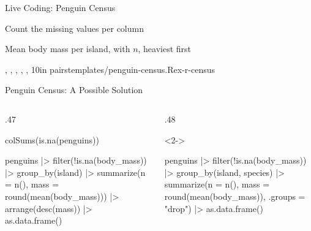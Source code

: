 \begin{frame}{Live Coding: Penguin Census}
   {\item Count the missing values per column
    \item Mean body mass per island, with \(n\), heaviest first}
   {, , , , , }
   {10}{in pairs}{templates/penguin-census.R}{ex-r-census}
\end{frame}

\begin{frame}{Penguin Census: A Possible Solution}
\begin{columns}[t,onlytextwidth]
   \begin{column}{.47\textwidth}
\tiny
{}
\begin{rsession}
colSums(is.na(penguins))
\end{rsession}
\begin{rsession}
penguins |>
  filter(!is.na(body_mass)) |>
  group_by(island) |>
  summarize(n = n(),
    mass = round(mean(body_mass))) |>
  arrange(desc(mass)) |>
  as.data.frame()
\end{rsession}
   \end{column}
   \begin{column}{.48\textwidth}
\tiny
\begin{uncoverenv}<2->
\begin{rsession}
penguins |>
  filter(!is.na(body_mass)) |>
  group_by(island, species) |>
  summarize(n = n(),
    mass = round(mean(body_mass)),
    .groups = "drop") |>
  as.data.frame()
\end{rsession}
\end{uncoverenv}
   \end{column}
\end{columns}
\end{frame}

